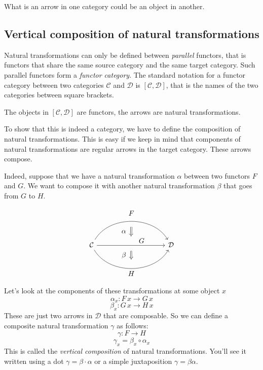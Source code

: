 \documentclass[DaoFP]{subfiles}
\begin{document}
What is an arrow in one category could be an object in another.

\subsection{Vertical composition of natural transformations}

Natural transformations can only be defined between \emph{parallel} functors, that is functors that share the same source category and the same target category. Such parallel functors form a \emph{functor category}. The standard notation for a functor category between two categories $\mathcal{C}$ and $\mathcal{D}$ is $[\mathcal{C}, \mathcal{D}]$, that is the names of the two categories between square brackets.

The objects in $[\mathcal{C}, \mathcal{D}]$ are functors, the arrows are natural transformations. 

To show that this is indeed a category, we have to define the composition of natural transformations. This is easy if we keep in mind that components of natural transformations are regular arrows in the target category. These arrows compose.

Indeed, suppose that we have a natural transformation $\alpha$ between two functors $F$ and $G$. We want to compose it with another natural transformation $\beta$ that goes from $G$ to $H$. 

\[
\begin{tikzcd}[column sep=huge]
\mathcal{C}
  \arrow[bend left=60]{rr}[name=U, label=above:$F$]{}
  \arrow[]{rr}[name=M, label={[xshift=15pt, yshift=-5pt]:$G$}]{} 
  \arrow[bend right=60]{rr}[name=D, label=below:$H$]{} 
 &&
\mathcal{D}
  \arrow[shorten <=8pt, shorten >=8pt,Rightarrow, to path={(U) -- node[label=left:$\alpha$] {} (M)}]{}
  \arrow[shorten <=8pt, shorten >=8pt,Rightarrow, to path={(M) -- node[label=left:$\beta$] {} (D)}]{}
\end{tikzcd}
\]


Let's look at the components of these transformations at some object $x$
\[ \alpha_x \colon F \, x \to G \, x \]
\[ \beta_x \colon G \, x \to H \, x \]
These are just two arrows in $\mathcal{D}$ that are composable. So we can define a composite natural transformation $\gamma$ as follows:
\[ \gamma \colon F \to H\]
\[ \gamma_x = \beta_x \circ \alpha_x \]
 This is called the \emph{vertical composition} of natural transformations. You'll see it written using a dot $\gamma = \beta \cdot \alpha$ or a simple juxtaposition $\gamma = \beta \alpha$.
\end{document}
